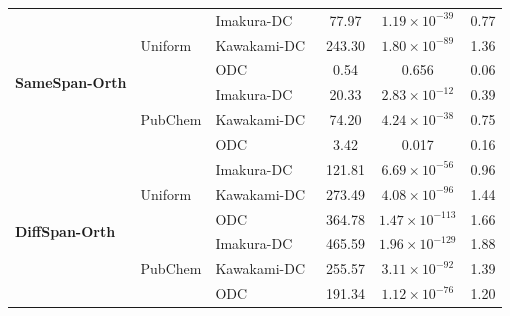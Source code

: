 \documentclass[final,3p,times]{elsarticle}
\theoremstyle{plain}
\begin{document}
\begin{table}[t]
\begin{tabular}{lllccc}
    \midrule
    \multirow{6}{*}{\textbf{SameSpan-Orth}}
      & \multirow{3}{*}{Uniform}
        & Imakura-DC~\cite{DCframework1}   & 77.97  & $1.19\times 10^{-39}$ & 0.77  \\
      &  & Kawakami-DC~\cite{KawakamiDC} & 243.30 & $1.80\times 10^{-89}$ & 1.36  \\
      &  & ODC         & 0.54   & 0.656                 & 0.06  \\
    \cmidrule(lr){2-6}
      & \multirow{3}{*}{PubChem}
        & Imakura-DC~\cite{DCframework1}   & 20.33  & $2.83\times 10^{-12}$ & 0.39  \\
      &  & Kawakami-DC~\cite{KawakamiDC} & 74.20  & $4.24\times 10^{-38}$ & 0.75  \\
      &  & ODC         & 3.42   & 0.017                 & 0.16  \\
    \midrule
    \multirow{6}{*}{\textbf{DiffSpan-Orth}}
      & \multirow{3}{*}{Uniform}
        & Imakura-DC~\cite{DCframework1}   & 121.81 & $6.69\times 10^{-56}$ & 0.96   \\
      &  & Kawakami-DC~\cite{KawakamiDC} & 273.49 & $4.08\times 10^{-96}$ & 1.44   \\
      &  & ODC         & 364.78 & $1.47\times 10^{-113}$ & 1.66  \\
    \cmidrule(lr){2-6}
      & \multirow{3}{*}{PubChem}
        & Imakura-DC~\cite{DCframework1}   & 465.59 & $1.96\times 10^{-129}$ & 1.88  \\
      &  & Kawakami-DC~\cite{KawakamiDC} & 255.57 & $3.11\times 10^{-92}$  & 1.39  \\
      &  & ODC         & 191.34 & $1.12\times 10^{-76}$  & 1.20  \\
    \bottomrule
  \end{tabular}
\end{table}
\end{document}
